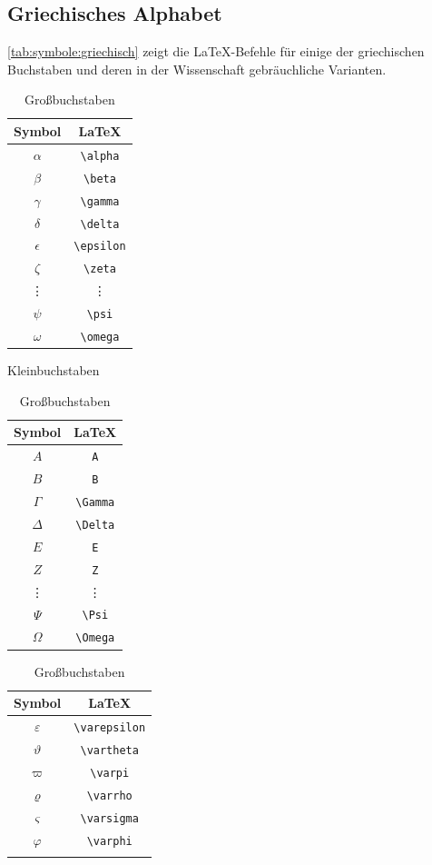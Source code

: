 		\subsection{Griechisches Alphabet}
			\autoref{tab:symbole:griechisch} zeigt die \LaTeX-Befehle für einige der griechischen Buchstaben und deren in der Wissenschaft gebräuchliche Varianten.
			\begin{table}[ht]
				\begin{subtable}[b]{0.23\linewidth}
					\begin{tabular}{c|c}
						Symbol & \LaTeX\\\hline
						$\alpha$ & \lstinline|\alpha|\\
						$\beta$ & \lstinline|\beta|\\
						$\gamma$ & \lstinline|\gamma|\\
						$\delta$ & \lstinline|\delta|\\
						$\epsilon$ & \lstinline|\epsilon|\\
						$\zeta$ & \lstinline|\zeta|\\
						\vdots & \vdots \\
						$\psi$ & \lstinline|\psi|\\
						$\omega$ & \lstinline|\omega|\\
					\end{tabular}
					\caption{Kleinbuchstaben}
				\end{subtable}
				\begin{subtable}[b]{0.21\linewidth}
					\begin{tabular}{c|c}
						Symbol & \LaTeX\\\hline
						$A$ & \lstinline|A|\\
						$B$ & \lstinline|B|\\
						$\Gamma$ & \lstinline|\Gamma|\\
						$\Delta$ & \lstinline|\Delta|\\
						$E$ & \lstinline|E|\\
						$Z$ & \lstinline|Z|\\
						\vdots & \vdots \\
						$\Psi$ & \lstinline|\Psi|\\
						$\Omega$ & \lstinline|\Omega|\\
					\end{tabular}
					\caption{Großbuchstaben}
				\end{subtable}
				\begin{subtable}[b]{0.27\linewidth}
					\begin{tabular}{c|c}
						Symbol & \LaTeX\\\hline
						$\varepsilon$ & \lstinline|\varepsilon|\\
						$\vartheta$ & \lstinline|\vartheta|\\
						$\varpi$ & \lstinline|\varpi|\\
						$\varrho$ & \lstinline|\varrho|\\
						$\varsigma$ & \lstinline|\varsigma| \\
						$\varphi$ & \lstinline|\varphi|\\
						\hline \vphantom{\vdots}&  \\
						

\end{tabular}
\end{subtable}
\end{table}

